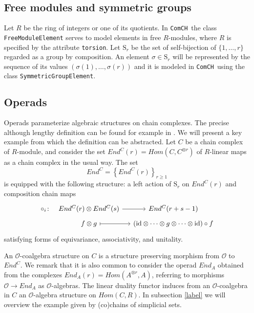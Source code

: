 \documentclass{amsart}
\renewcommand{\S}{\mathrm S}
\newcommand{\comch}{\texttt{ComCH}}
\newcommand{\id}{\mathrm{id}}
\begin{document}
\subsection{Free modules and symmetric groups}

Let $R$ be the ring of integers or one of its quotients. In \comch\, the class \texttt{FreeModuleElement} serves to model elements in free $R$-modules, where $R$ is specified by the attribute \texttt{torsion}. Let $\S_r$ be the set of self-bijection of $\{1, \dots, r\}$ regarded as a group by composition. An element $\sigma \in \S_r$ will be represented by the sequence of its values $(\sigma(1), \dots, \sigma(r))$ and it is modeled in \comch\, using the class \texttt{SymmetricGroupElement}.

\subsection{Operads}

Operads parameterize algebraic structures on chain complexes. The precise although lengthy definition can be found for example in \cite{Markl08}. We will present a key example from which the definition can be abstracted. Let $C$ be a chain complex of $R$-module, and consider the set $End^C(r) = Hom(C, C^{\otimes r})$ of $R$-linear maps as a chain complex in the usual way. The set 
\begin{equation*}
End^C = \left\{End^C(r)\right\}_{r \geq 1}
\end{equation*}
is equipped with the following structure: a left action of $\S_r$ on $End^C(r)$ and composition chain maps
\begin{equation*}
\begin{tikzcd}[column sep=small, row sep=tiny]
\circ_i \colon &[-10pt] End^C(r) \otimes End^C(s) \arrow[r] & End^C(r+s-1) \\
& f \otimes g \arrow[r, |->] & (\id \otimes \cdots \otimes g \otimes \cdots \otimes \id) \circ f 
\end{tikzcd}
\end{equation*}
satisfying forms of equivariance, associativity, and unitality.

An $\mathcal O$-coalgebra structure on $C$ is a structure preserving morphism from $\mathcal O$ to $End^C$. We remark that it is also common to consider the operad $End_A$ obtained from the complexes $End_A(r) = Hom(A^{\otimes r}, A)$, referring to morphisms $\mathcal O \to End_A$ as $\mathcal O$-algebras. The linear duality functor induces from an $\mathcal O$-coalgebra in $C$ an $\mathcal O$-algebra structure on $Hom(C, R)$. In subsection \ref{label} we will overview the example given by (co)chains of simplicial sets.
\end{document}
